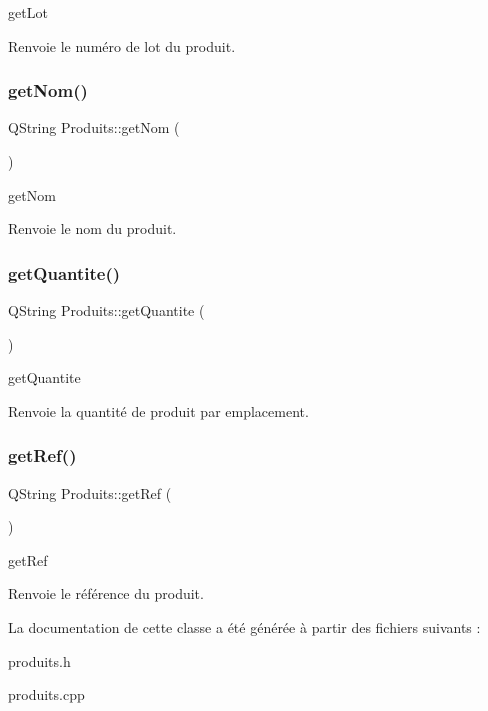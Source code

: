 get\+Lot 

\begin{DoxyReturn}{Renvoie}
le numéro de lot du produit. 
\end{DoxyReturn}
\mbox{\label{class_produits_a5708325c18db12146f0465448398be84}} 
\subsubsection{\texorpdfstring{get\+Nom()}{getNom()}}
{\footnotesize\ttfamily Q\+String Produits\+::get\+Nom (\begin{DoxyParamCaption}{ }\end{DoxyParamCaption})}



get\+Nom 

\begin{DoxyReturn}{Renvoie}
le nom du produit. 
\end{DoxyReturn}
\mbox{\label{class_produits_a6bd3be10a39c03cc092befda9b8bc28e}} 
\subsubsection{\texorpdfstring{get\+Quantite()}{getQuantite()}}
{\footnotesize\ttfamily Q\+String Produits\+::get\+Quantite (\begin{DoxyParamCaption}{ }\end{DoxyParamCaption})}



get\+Quantite 

\begin{DoxyReturn}{Renvoie}
la quantité de produit par emplacement. 
\end{DoxyReturn}
\mbox{\label{class_produits_a0fef797c8b1c1ae2aa5687e53aadb48b}} 
\subsubsection{\texorpdfstring{get\+Ref()}{getRef()}}
{\footnotesize\ttfamily Q\+String Produits\+::get\+Ref (\begin{DoxyParamCaption}{ }\end{DoxyParamCaption})}



get\+Ref 

\begin{DoxyReturn}{Renvoie}
le référence du produit. 
\end{DoxyReturn}


La documentation de cette classe a été générée à partir des fichiers suivants \+:\begin{DoxyCompactItemize}
\item 
produits.\+h\item 
produits.\+cpp\end{DoxyCompactItemize}
